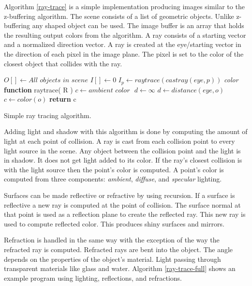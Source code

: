 Algorithm \ref{ray-trace} is a simple implementation producing images similar to the z-buffering algorithm.  The scene consists of a list of geometric objects.  Unlike z-buffering any shaped object can be used.  The image buffer is an array that holds the resulting output colors from the algorithm.  A ray consists of a starting vector and a normalized direction vector.  A ray is created at the eye/starting vector in the direction of each pixel in the image plane.  The pixel is set to the color of the closest object that collides with the ray.  

\begin{algorithm}[H]
\begin{algorithmic}[1]
\STATE $O[ ] \gets \textit{All objects in scene}$ 
\STATE $I[] \gets 0$ 
\STATE
{}
	\STATE $I_{p} \gets raytrace( castray( eye, p ))$
\ENDFOR
\STATE 
\STATE \textit{color} \textbf{function} raytrace(  R )
	\STATE $c  \gets \textit{ambient color } $
	\STATE $d \gets \infty $
				\STATE $d \gets distance( \textit{eye}, o )$
				\STATE $c \gets color( o )$
			\ENDIF
		\ENDIF
	\ENDFOR
	\STATE \textbf{return} c

\end{algorithmic}
\caption{Simple ray tracing algorithm.}
\label{ray-trace}
\end{algorithm}

Adding light and shadow with this algorithm is done by computing the amount of light at each point of collision.  A ray is cast from each collision point to every light source in the scene.  Any object between the collision point and the light is in shadow.   It does not get light added to its color. If the ray's closest collision is with the light source then the point's color is computed.  A point's color is computed from three components: \textit{ambient}, \textit{diffuse}, and \textit{specular} lighting\cite{kalinini:2008}.

Surfaces can be made reflective or refractive by using recursion.  If a surface is reflective a new ray is computed at the point of collision.   The surface normal at that point  is used as a reflection plane to create the reflected ray.  This new ray is used to compute reflected color.  This produces shiny surfaces and mirrors.  

Refraction is handled in the same way with the exception of the way the refracted ray is computed.  Refracted rays are bent into the object.  The angle depends on the properties of the object's material.  Light passing through transparent materials like glass and water. Algorithm \ref{ray-trace-full} shows an example program using lighting, reflections, and refractions.
  
